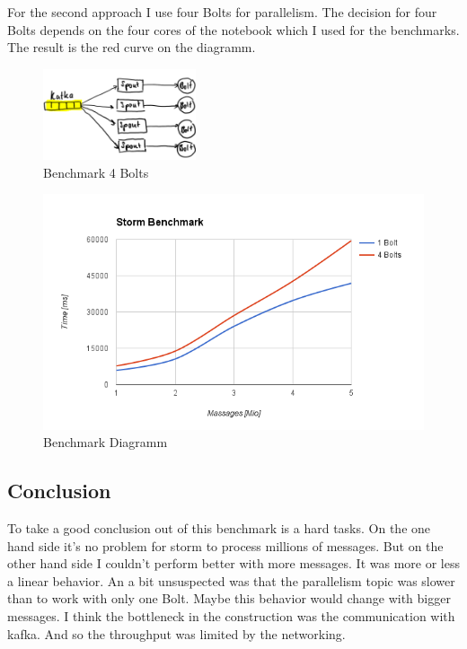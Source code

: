 For the second approach I use four Bolts for parallelism.
The decision for four Bolts depends on the four cores of the notebook which I used for the benchmarks.
The result is the red curve on the diagramm.

\begin{figure}[H]
\centering
\captionsetup{justification=centering}
\includegraphics[width=0.4\textwidth]{images/benchmark_topic2.png}
\caption[Benchmark 4 Bolts]{Benchmark 4 Bolts}
\end{figure}


\begin{figure}[H]
\centering
\captionsetup{justification=centering}
\includegraphics[width=1.0\textwidth]{images/benchmark.png}
\caption[Benchmark Diagramm]{Benchmark Diagramm}
\end{figure}

\subsection{Conclusion}
To take a good conclusion out of this benchmark is a hard tasks.
On the one hand side it's no problem for storm to process millions of messages.
But on the other hand side I couldn't perform better with more messages. It was more or less a linear behavior.
An a bit unsuspected was that the parallelism topic was slower than to work with only one Bolt.
Maybe this behavior would change with bigger messages.
I think the bottleneck in the construction was the communication with kafka. And so the throughput was limited by the networking.





